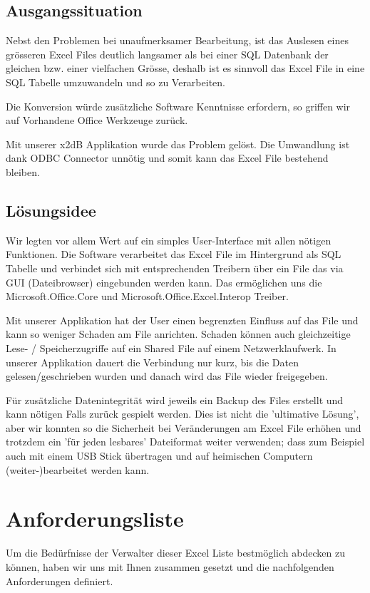 \documentclass{article}
\begin{document}
\subsection{Ausgangssituation}
Nebst den Problemen bei unaufmerksamer Bearbeitung, ist das Auslesen eines grösseren Excel Files deutlich langsamer als bei einer SQL Datenbank der gleichen bzw. einer vielfachen Grösse, deshalb ist es sinnvoll das Excel File in eine SQL Tabelle umzuwandeln und so zu Verarbeiten.

Die Konversion würde zusätzliche Software Kenntnisse erfordern, so griffen wir auf Vorhandene Office Werkzeuge zurück.

Mit unserer x2dB Applikation wurde das Problem gelöst. Die Umwandlung ist dank ODBC Connector unnötig und somit kann das Excel File bestehend bleiben.

\subsection{Lösungsidee}
Wir legten vor allem Wert auf ein simples User-Interface mit allen nötigen Funktionen. Die Software verarbeitet das Excel File im Hintergrund als SQL Tabelle und verbindet sich mit entsprechenden Treibern über ein File das via GUI (Dateibrowser) eingebunden werden kann. Das ermöglichen uns die Microsoft.Office.Core und Microsoft.Office.Excel.Interop Treiber.

Mit unserer Applikation hat der User einen begrenzten Einfluss auf das File und kann so weniger Schaden am File anrichten. Schaden können auch gleichzeitige Lese- / Speicherzugriffe auf ein Shared File auf einem Netzwerklaufwerk. In unserer Applikation dauert die Verbindung nur kurz, bis die Daten gelesen/geschrieben wurden und danach wird das File wieder freigegeben.

Für zusätzliche Datenintegrität wird jeweils ein Backup des Files erstellt und kann nötigen Falls zurück gespielt werden. Dies ist nicht die 'ultimative Lösung', aber wir konnten so die Sicherheit bei Veränderungen am Excel File erhöhen und trotzdem ein 'für jeden lesbares' Dateiformat weiter verwenden; dass zum Beispiel auch mit einem USB Stick übertragen und auf heimischen Computern (weiter-)bearbeitet werden kann.

\newpage

\section{Anforderungsliste}
Um die Bedürfnisse der Verwalter dieser Excel Liste bestmöglich abdecken zu können, haben wir uns mit Ihnen zusammen gesetzt und die nachfolgenden Anforderungen definiert. 
	
\end{document}
